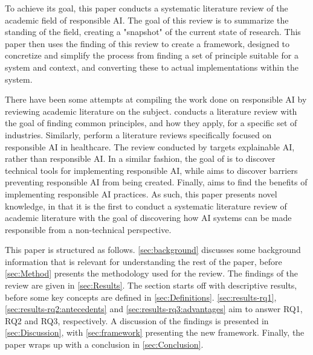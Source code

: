 To achieve its goal, this paper conducts a systematic literature review of the academic field of responsible AI. The goal of this review is to summarize the standing of the field, creating a "snapshot" of the current state of research. This paper then uses the finding of this review to create a framework, designed to concretize and simplify the process from finding a set of principle suitable for a system and context, and converting these to actual implementations within the system.

There have been some attempts at compiling the work done on responsible AI by reviewing academic literature on the subject. \textcite{Anagnostou_2022} conducts a literature review with the goal of finding common principles, and how they apply, for a specific set of industries. Similarly, \textcite{Lukkien_2021,Siala_2022} perform a literature reviews specifically focused on responsible AI in healthcare. The review conducted by \textcite{BarredoArrieta_2020} targets explainable AI, rather than responsible AI. In a similar fashion, the goal of \textcite{Morley_2020} is to discover technical tools for implementing responsible AI, while \textcite{Merhi_2022} aims to discover barriers preventing responsible AI from being created. Finally, \textcite{WangY_2020} aims to find the benefits of implementing responsible AI practices. As such, this paper presents novel knowledge, in that it is the first to conduct a systematic literature review of academic literature with the goal of discovering how AI systems can be made responsible from a non-technical perspective.

This paper is structured as follows. \autoref{sec:background} discusses some background information that is relevant for understanding the rest of the paper, before \autoref{sec:Method} presents the methodology used for the review. The findings of the review are given in \autoref{sec:Results}. The section starts off with descriptive results, before some key concepts are defined in \autoref{sec:Definitions}. \autoref{sec:results-rq1}, \ref{sec:results-rq2:antecedents} and \ref{sec:results-rq3:advantages} aim to answer RQ1, RQ2 and RQ3, respectively. A discussion of the findings is presented in \autoref{sec:Discussion}, with \autoref{sec:framework} presenting the new framework. Finally, the paper wraps up with a conclusion in \autoref{sec:Conclusion}.

